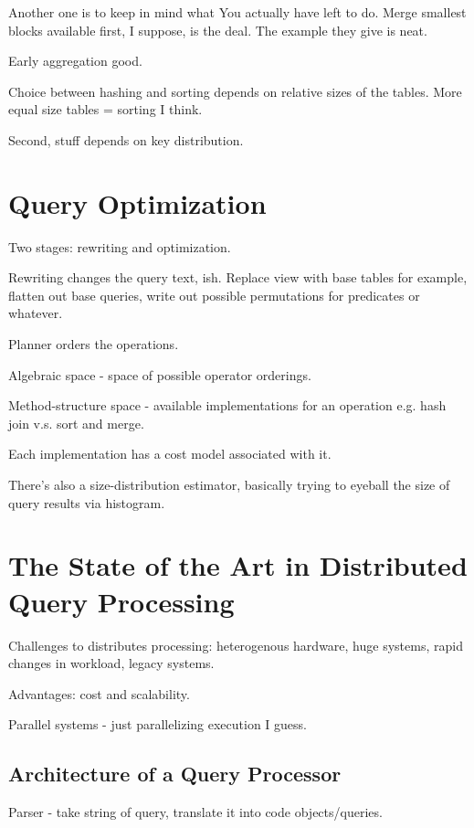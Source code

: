 \documentclass{article}
\begin{document}
	Another one is to keep in mind what You actually have left to do. Merge smallest blocks available first, I suppose, is the deal. The example they give is neat.
	
	Early aggregation good.
	
	Choice between hashing and sorting depends on relative sizes of the tables. More equal size tables = sorting I think.
	
	Second, stuff depends on key distribution.
		
\newpage
\section{Query Optimization}	

	Two stages: rewriting and optimization.
	
	Rewriting changes the query text, ish. Replace view with base tables for example, flatten out base queries, write out possible permutations for predicates or whatever.
	
	Planner orders the operations.
	
	Algebraic space - space of possible operator orderings.
	
	Method-structure space - available implementations for an operation e.g. hash join v.s. sort and merge.
	
	Each implementation has a cost model associated with it.
	
	There's also a size-distribution estimator, basically trying to eyeball the size of query results via histogram.
	
	
		
\newpage
\section{The State of the Art in Distributed Query Processing}

	Challenges to distributes processing: heterogenous hardware, huge systems, rapid changes in workload, legacy systems.
	
	Advantages: cost and scalability.
	
	Parallel systems - just parallelizing execution I guess.
	
	\subsection{Architecture of a Query Processor}
	
		Parser - take string of query, translate it into code objects/queries.
		
\end{document}
